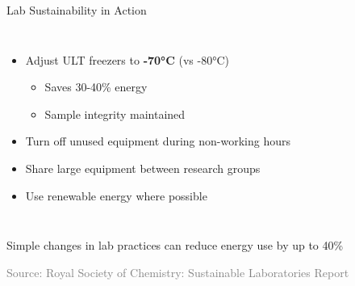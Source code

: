 \documentclass{beamer}
\newcommand{\highlight}[1]{\textcolor{taskred}{\textbf{#1}}}
\newcommand{\source}[1]{\vspace{0.3cm}\hfill\scriptsize\textcolor{gray}{Source: #1}}
\newenvironment{actionblock}{\begin{tcolorbox}[colback=taskgreen!20, colframe=taskgreen, title=\textbf{Action Item}]}{\end{tcolorbox}}
\begin{document}
\begin{frame}{Lab Sustainability in Action}
\begin{columns}
\begin{itemize}[spacing=0.8em]
    \item Adjust ULT freezers to \highlight{-70°C} (vs -80°C)
      \begin{itemize}
        \item Saves 30-40\% energy
        \item Sample integrity maintained
      \end{itemize}
    \item Turn off unused equipment during non-working hours
    \item Share large equipment between research groups
    \item Use renewable energy where possible
\end{itemize}
\end{columns}

\begin{actionblock}
Simple changes in lab practices can reduce energy use by up to 40\%
\end{actionblock}

\source{Royal Society of Chemistry: Sustainable Laboratories Report}
\end{frame}
\end{document}
